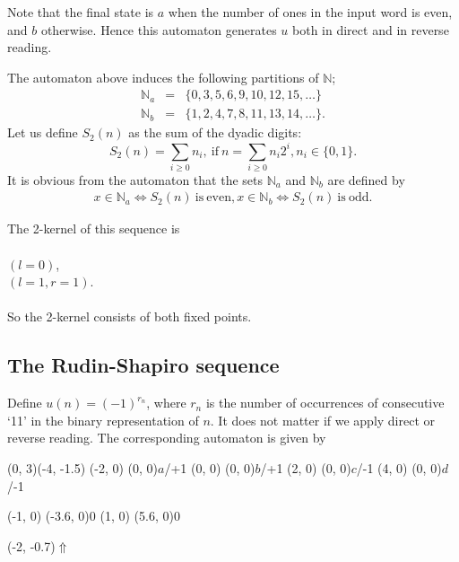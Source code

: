 \documentclass{article}
\begin{document}
Note that the final state is $a$ when the number of ones in the input word
is even, and $b$ otherwise. Hence this automaton generates $u$ both in direct
and in reverse reading.

The automaton above induces the following partitions of $\mathbb{N}$; 
\begin{eqnarray*}
\mathbb{N}_a &=& \{0, 3, 5, 6, 9, 10, 12, 15, \ldots\}\\
\mathbb{N}_b &=& \{1, 2, 4, 7, 8, 11, 13, 14, \ldots\}.
\end{eqnarray*}
Let us define $S_2(n)$ as the sum of the dyadic digits:
\begin{displaymath}
S_2(n) = \sum_{i \ge 0}n_i,\mathrm{\ if\ }
n = \sum_{i \ge 0}n_i2^i, n_i \in \{0, 1\}.
\end{displaymath}
It is obvious from the automaton that the sets $\mathbb{N}_a$ and 
$\mathbb{N}_b$ are defined by
\begin{eqnarray*}
x \in \mathbb{N}_a \Leftrightarrow S_2(n) \mathrm{\ is\ even},
x \in \mathbb{N}_b \Leftrightarrow S_2(n) \mathrm{\ is\ odd}.
\end{eqnarray*}

The 2-kernel of this sequence is\\
\\
 $(l = 0)$,\\
 $(l = 1, r = 1)$.\\
\\
So the 2-kernel consists of both fixed points.

\subsection{The Rudin-Shapiro sequence}
Define $u(n) = (-1)^{r_n}$, where $r_n$ is the number of occurrences of
consecutive `11' in the binary representation of $n$. It does not matter if we 
apply direct or reverse reading. The corresponding automaton is given by

\begin{graph}(0, 3)(-4, -1.5)
  (-2, 0) (0, 0){\bs$a$/+1\es}
  (0, 0)  (0, 0){\bs$b$/+1\es}
  (2, 0)  (0, 0){\bs$c$/-1\es}
  (4, 0)  (0, 0){\bs$d$/-1\es}

  (-1, 0) \freetext(-3.6, 0){0}
   
   
   
   
   
  (1, 0) \freetext(5.6, 0){0}
   

  \freetext(-2, -0.7){$\Uparrow$}
\end{graph}
\end{document}
